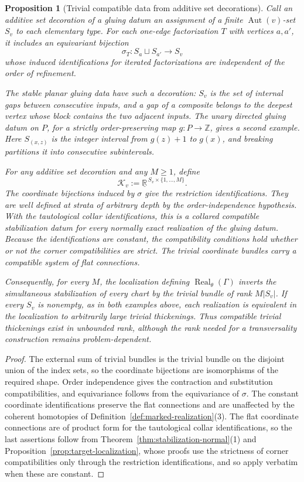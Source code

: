 \documentclass[11pt,letterpaper,twoside]{article}
\theoremstyle{plain}
\newtheorem{proposition}[theorem]{Proposition}
\theoremstyle{definition}
\theoremstyle{remark}
\newcommand{\Real}{\operatorname{Real}}
\begin{document}
\begin{proposition}[Trivial compatible data from additive set decorations]\label{prop:additive-data}
Call an \emph{additive set decoration} of a gluing datum an assignment of a finite \(\operatorname{Aut}(v)\)-set \(S_v\) to each elementary type.  For each one-edge factorization \(T\) with vertices \(a,a'\), it includes an equivariant bijection
\[
 \sigma_T:S_a\sqcup S_{a'}\longrightarrow S_v
\]
whose induced identifications for iterated factorizations are independent of the order of refinement.

The stable planar gluing data have such a decoration: \(S_v\) is the set of internal gaps between consecutive inputs, and a gap of a composite belongs to the deepest vertex whose block contains the two adjacent inputs.  The unary directed gluing datum on \(P\), for a strictly order-preserving map \(g:P\to\mathbb Z\), gives a second example.  Here \(S_{(x,z)}\) is the integer interval from \(g(z)+1\) to \(g(x)\), and breaking partitions it into consecutive subintervals.

For any additive set decoration and any \(M\ge1\), define
\[
 \mathcal K_v:=\underline{\mathbb R}^{\,S_v\times\{1,\dots,M\}}.
\]
The coordinate bijections induced by \(\sigma\) give the restriction identifications.  They are well defined at strata of arbitrary depth by the order-independence hypothesis.  With the tautological collar identifications, this is a collared compatible stabilization datum for every normally exact realization of the gluing datum.  Because the identifications are constant, the compatibility conditions hold whether or not the corner compatibilities are strict.  The trivial coordinate bundles carry a compatible system of flat connections.

Consequently, for every \(M\), the localization defining \(\Real_\theta(\Gamma)\) inverts the simultaneous stabilization of every chart by the trivial bundle of rank \(M|S_v|\).  If every \(S_v\) is nonempty, as in both examples above, each realization is equivalent in the localization to arbitrarily large trivial thickenings.  Thus compatible trivial thickenings exist in unbounded rank, although the rank needed for a transversality construction remains problem-dependent.
\end{proposition}

\begin{proof}
The external sum of trivial bundles is the trivial bundle on the disjoint union of the index sets, so the coordinate bijections are isomorphisms of the required shape.  Order independence gives the contraction and substitution compatibilities, and equivariance follows from the equivariance of \(\sigma\).  The constant coordinate identifications preserve the flat connections and are unaffected by the coherent homotopies of Definition~\ref{def:marked-realization}(3).  The flat coordinate connections are of product form for the tautological collar identifications, so the last assertions follow from Theorem~\ref{thm:stabilization-normal}(1) and Proposition~\ref{prop:target-localization}, whose proofs use the strictness of corner compatibilities only through the restriction identifications, and so apply verbatim when these are constant.
\end{proof}
\end{document}
